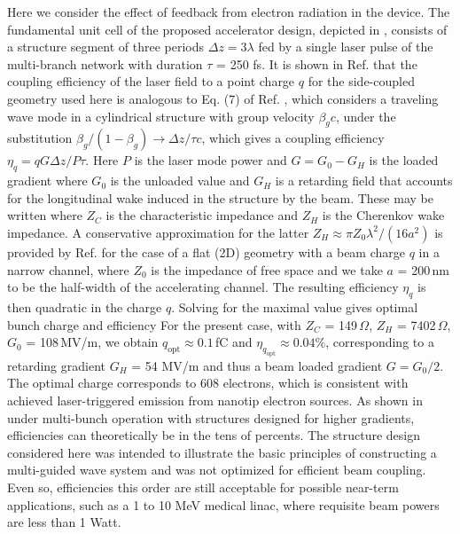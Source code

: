 Here we consider the effect of feedback from electron radiation in the device.
The fundamental unit cell of the proposed accelerator design, depicted in , consists of a structure segment of three periods $\Delta z = 3 \lambda$ fed by a single laser pulse of the multi-branch network with duration $\tau$ = 250 fs.
It is shown in Ref.
 that the coupling efficiency of the laser field to a point charge $q$ for the side-coupled geometry used here is analogous to Eq.
(7) of Ref.
, which considers a traveling wave mode in a cylindrical structure with group velocity $\beta_g c$, under the substitution $\beta_g / (1-\beta_g) \rightarrow \Delta z / \tau c$, which gives a coupling efficiency $\eta_q = q G \Delta z / P \tau$.
 Here $P$ is the laser mode power and $G = G_0 - G_H$ is the loaded gradient where $G_0$ is the unloaded value and $G_H$ is a retarding field that accounts for the longitudinal wake induced in the structure by the beam.
 These may be written
where $Z_C$ is the characteristic impedance and $Z_H$ is the Cherenkov wake impedance.
 A conservative approximation for the latter $Z_H \approx \pi Z_0 \lambda^2 / (16 a^2)$ is provided by Ref.
 for the case of a flat (2D) geometry with a beam charge $q$ in a narrow channel, where $Z_0$ is the impedance of free space and we take $a$ = 200\,nm to be the half-width of the accelerating channel.
 The resulting efficiency $\eta_q$ is then quadratic in the charge $q$.
 Solving for the maximal value gives optimal bunch charge and efficiency
For the present case, with $Z_C$ = 149\,$\Omega$, $Z_H$ = 7402\,$\Omega$, $G_0$ = 108\,MV/m, we obtain $q_\text{opt} \approx 0.1$\,fC and $\eta_{q_\text{opt}} \approx 0.04 \%$, corresponding to a retarding gradient  $G_H$ = 54 MV/m and thus a beam loaded gradient $G = G_0/2$.
The optimal charge corresponds to 608 electrons, which is consistent with achieved laser-triggered emission from nanotip electron sources.
As shown in \cite{Siemann:PRSTB05} under multi-bunch operation with structures designed for higher gradients, efficiencies can theoretically be in the tens of percents.
The structure design considered here was intended to illustrate the basic principles of constructing a multi-guided wave system and was not optimized for efficient beam coupling.
Even so, efficiencies this order are still acceptable for possible near-term applications, such as a 1 to 10 MeV medical linac, where requisite beam powers are less than 1 Watt.
 
